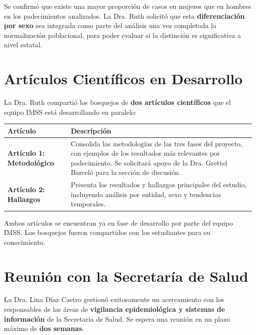 \documentclass[11pt, a4paper]{article}
\begin{document}
Se confirmó que existe una mayor proporción de casos en mujeres que en hombres en los padecimientos analizados. La Dra. Ruth solicitó que esta \textbf{diferenciación por sexo} sea integrada como parte del análisis una vez completada la normalización poblacional, para poder evaluar si la distinción es significativa a nivel estatal.

\vspace{0.5cm}

\section{Artículos Científicos en Desarrollo}

La Dra. Ruth compartió los bosquejos de \textbf{dos artículos científicos} que el equipo IMSS está desarrollando en paralelo:

\begin{tabularx}{\textwidth}{>{\bfseries}l X}
    \toprule
    \rowcolor{lightgray}
    \textbf{\color{imssgreen}Artículo} & \textbf{\color{imssgreen}Descripción} \\
    \midrule
    Artículo 1: Metodológico & Consolida las metodologías de las tres fases del proyecto, con ejemplos de los resultados más relevantes por padecimiento. Se solicitará apoyo de la Dra. Grettel Barceló para la sección de discusión. \\
    \rowcolor{lightgray}
    Artículo 2: Hallazgos & Presenta los resultados y hallazgos principales del estudio, incluyendo análisis por entidad, sexo y tendencias temporales. \\
    \bottomrule
\end{tabularx}

\vspace{0.3cm}
Ambos artículos se encuentran ya en fase de desarrollo por parte del equipo IMSS. Los bosquejos fueron compartidos con los estudiantes para su conocimiento.

\vspace{0.5cm}

\section{Reunión con la Secretaría de Salud}

La Dra. Lina Díaz Castro gestionó exitosamente un acercamiento con los responsables de las áreas de \textbf{vigilancia epidemiológica y sistemas de información} de la Secretaría de Salud. Se espera una reunión en un plazo máximo de \textbf{dos semanas}.
\end{document}

